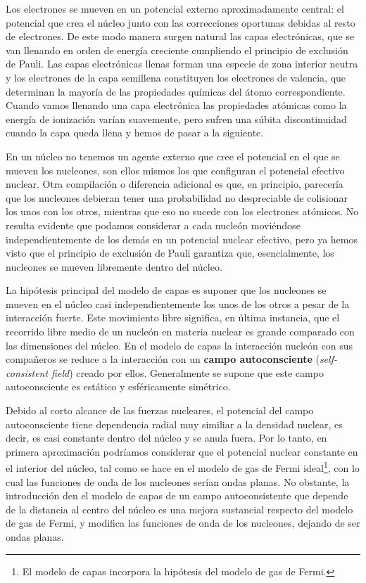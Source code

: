 Los electrones se mueven en un potencial externo aproximadamente central: el potencial que crea el núcleo junto con las correcciones oportunas debidas al resto de electrones. De este modo manera surgen natural las capas electrónicas, que se van llenando en orden de energía creciente cumpliendo el principio de exclusión de Pauli. Las capas electrónicas llenas forman una especie de zona interior neutra y los electrones de la capa semillena constituyen los electrones de valencia, que determinan la mayoría de las propiedades químicas del átomo correspondiente. Cuando vamos llenando una capa electrónica las propiedades atómicas como la energía de ionización varían suavemente, pero sufren una súbita discontinuidad cuando la capa queda llena y hemos de pasar a la siguiente. 

En un núcleo no tenemos un agente externo que cree el potencial en el que se mueven los nucleones, son ellos mismos los que configuran el potencial efectivo nuclear. Otra compilación o diferencia adicional es que, en principio, parecería que los nucleones debieran tener una probabilidad no despreciable de colisionar los unos con los otros, mientras que eso no sucede con los electrones atómicos. No resulta evidente que podamos considerar a cada nucleón moviéndose independientemente de los demás en un potencial nuclear efectivo, pero ya hemos visto que el principio de exclusión de Pauli garantiza que, esencialmente, los nucleones se mueven libremente dentro del núcleo. 

La hipótesis principal del modelo de capas es suponer que los nucleones se mueven en el núcleo casi independientemente los unos de los otros a pesar de la interacción fuerte. Este movimiento libre significa, en última instancia, que el recorrido libre medio de un nucleón en materia nuclear es grande comparado con las dimensiones del núcleo. En el modelo de capas la interacción nucleón con sus compañeros se reduce a la interacción con un \textbf{campo autoconsciente} (\textit{self-consistent field}) creado por ellos. Generalmente se supone que este campo autoconsciente es estático y esféricamente simétrico.

Debido al corto alcance de las fuerzas nucleares, el potencial del campo autoconsciente tiene dependencia radial muy similiar a la densidad nuclear, es decir, es casi constante dentro del núcleo y se anula fuera. Por lo tanto, en primera aproximación podríamos considerar que el potencial nuclear constante en el interior del núcleo, tal como se hace en el modelo de gas de Fermi ideal\footnote{El modelo de capas incorpora la hipótesis del modelo de gas de Fermi.}, con lo cual las funciones de onda de los nucleones serían ondas planas. No obstante, la introducción den el modelo de capas de un campo autoconsistente que depende de la distancia al centro del núcleo es una mejora sustancial respecto del modelo de gas de Fermi, y modifica las funciones de onda de los nucleones, dejando de ser ondas planas. 

